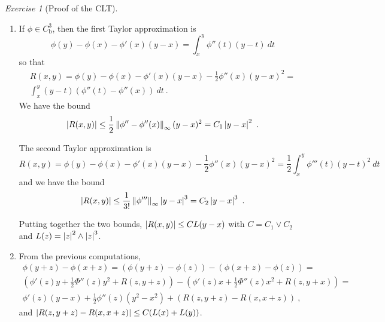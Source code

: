 \documentclass[12pt,a4paper]{amsart}
\theoremstyle{plain}%
\theoremstyle{definition}
\theoremstyle{remark}
\newtheorem{exercise}{Exercise}
\begin{document}
\begin{exercise}[Proof of the CLT]
  \begin{enumerate}
  \item If $\phi \in C^3_{\text{b}}$, then the first Taylor approximation is
    \begin{equation*}
      \phi(y) - \phi(x) - \phi'(x)(y-x) = \int_x^y \phi''(t)(y-t) \ dt 
    \end{equation*}
so that
\begin{multline*}
      R(x,y) = \phi(y) - \phi(x) - \phi'(x)(y-x) -\frac12 \phi''(x)(y-x)^2 = \\ \int_x^y (y-t)(\phi''(t) - \phi''(x)) \ dt \ . 
    \end{multline*}
 We have the bound
 \begin{equation*}
   \left\vert R(x,y)\right\vert \leq \frac12 \left\Vert\phi'' - \phi''(x)\right\Vert_{\infty} (y-x)^2 = C_1 \left\vert y-x\right\vert^2\ .
 \end{equation*}

    The second Taylor approximation is
    \begin{equation*}
     R(x,y) = \phi(y) - \phi(x) - \phi'(x)(y-x) - \frac12 \phi''(x)(y-x)^2 = \frac1{2}\int_x^y \phi'''(t)(y-t)^2 \ dt 
   \end{equation*}
and we have the bound
\begin{equation*}
  \aval{R(x,y)} \leq \frac1{3!} \normat \infty {\phi'''}  \aval{y-x}^3 = C_2 \aval{y-x}^3 \ .
\end{equation*}

Putting together the two bounds, $\left\vert R(x,y)\right\vert \leq C L(y-x)$ with $C = C_1 \vee C_2$ and $L(z) = \left\vert z\right\vert^2 \wedge \left\vert z\right\vert^3$.

\item 
  From the previous computations,
  \begin{multline*}
\phi(y+z) - \phi(x+z) = (\phi(y+z) - \phi(z)) - (\phi(x+z) - \phi(z)) = \\
   \left(\phi'(z)y + \frac12 \Phi''(z)y^2 + R(z,y+z)\right) - \left(\phi'(z)x + \frac12 \Phi''(z)x^2 + R(z,y+x)\right) = \\
   \phi'(z)(y-x) + \frac12 \phi''(z)(y^2-x^2) + \left(R(z,y+z) - R(x,x+z)\right) \ ,
 \end{multline*}
 and $\left\vert R(z,y+z) - R(x,x+z)\right\vert \leq C(L(x) + L(y))$.


\end{enumerate}
\end{exercise}
\end{document}
